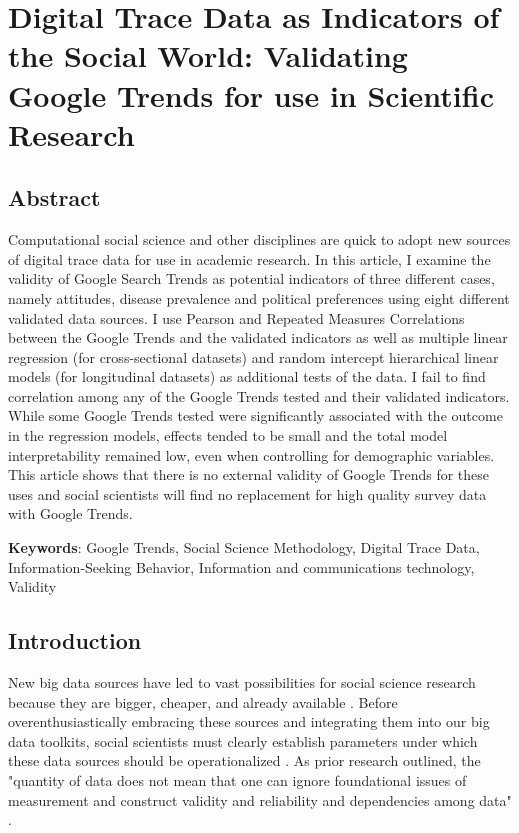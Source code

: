 \hypertarget{paper-1}{%
\chapter{Digital Trace Data as Indicators of the Social World: Validating Google Trends for use in Scientific Research}\label{paper-1}}


\section{Abstract}

Computational social science and other disciplines are quick to 
adopt new sources of digital trace data for use in academic research. 
In this article, I examine the validity of Google Search Trends 
as potential indicators of three different cases, namely attitudes, 
disease prevalence and political preferences using eight %
different validated data sources. I use Pearson and Repeated Measures Correlations 
between the Google Trends and the validated indicators as well as multiple linear regression
(for cross-sectional datasets) and random intercept hierarchical linear models
(for longitudinal datasets) as additional tests of the data. 
I fail to find correlation among any of the Google 
Trends tested and their validated indicators. While some Google Trends 
tested were significantly associated with the outcome in the regression models,
effects tended to be small and the total model interpretability remained low,
even when controlling for demographic variables. This article shows that there is no 
external validity of Google Trends for these uses and social scientists
will find no replacement for high quality survey data with Google Trends. 

\textbf{Keywords}: Google Trends, Social Science Methodology, Digital Trace Data, Information-Seeking Behavior, Information and communications technology, Validity

\section{Introduction}
New big data sources have led to vast possibilities for social science
research because they are bigger, cheaper, and already available
\citep{kingEnsuringDataRichFuture2011,lazerComputationalSocialScience2009,salganikBitBitSocial2017}.
Before overenthusiastically embracing these
sources and integrating them into our big data toolkits, social scientists must clearly establish
parameters under which these data sources should be operationalized
\citep{bailCulturalEnvironmentMeasuring2014, lazerParableGoogleFlu2014}. As
prior research outlined, the "quantity of data does not mean that one
can ignore foundational issues of measurement and construct validity and
reliability and dependencies among data" 
\citep[p. 1203]{lazerParableGoogleFlu2014}. 

